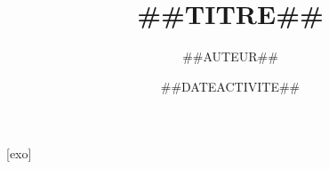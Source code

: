 \documentclass[c]{beamer}
\title{##{{TITRE}}##}
\author{##{{AUTEUR}}##}
\institute{##{{ETABLISSEMENT}}##}
\date{##{{DATEACTIVITE}}##}
\begin{document}
[exo]
\renewcommand{\thenocalcul}{\Alph{nocalcul}}
\end{document}
